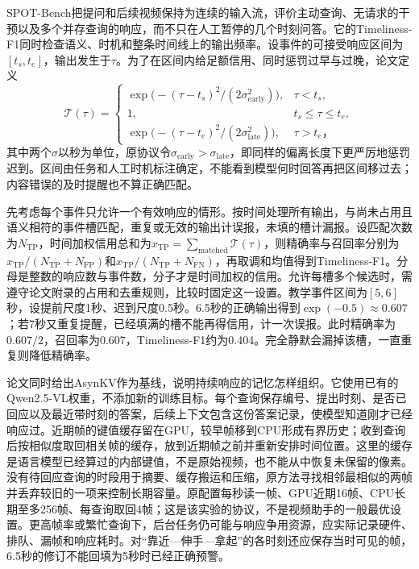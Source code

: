 SPOT-Bench把提问和后续视频保持为连续的输入流，评价主动查询、无请求的干预以及多个并存查询的响应，而不只在人工暂停的几个时刻问答。它的Timeliness-F1同时检查语义、时机和整条时间线上的输出频率。设事件的可接受响应区间为$[t_s,t_e]$，输出发生于$\tau$。为了在区间内给足额信用、同时惩罚过早与过晚，论文定义
\begin{equation}
 \mathcal{T}(\tau)=
 \begin{cases}
  \exp\!\bigl(-(\tau-t_s)^2/(2\sigma_{\mathrm{early}}^2)\bigr),
    &\tau<t_s,\\
  1,&t_s\leq\tau\leq t_e,\\
  \exp\!\bigl(-(\tau-t_e)^2/(2\sigma_{\mathrm{late}}^2)\bigr),
    &\tau>t_e\text{，}
 \end{cases}
 \label{eq:vision-video-timeliness}
\end{equation}
其中两个$\sigma$以秒为单位，原协议令$\sigma_{\mathrm{early}}>\sigma_{\mathrm{late}}$，即同样的偏离长度下更严厉地惩罚迟到。区间由任务和人工时机标注确定，不能看到模型何时回答再把区间移过去；内容错误的及时提醒也不算正确匹配。

先考虑每个事件只允许一个有效响应的情形。按时间处理所有输出，与尚未占用且语义相符的事件槽匹配，重复或无效的输出计误报，未填的槽计漏报。设匹配次数为$N_{\mathrm{TP}}$，时间加权信用总和为$x_{\mathrm{TP}}=\sum_{\mathrm{matched}}\mathcal{T}(\tau)$，则精确率与召回率分别为$x_{\mathrm{TP}}/(N_{\mathrm{TP}}+N_{\mathrm{FP}})$和$x_{\mathrm{TP}}/(N_{\mathrm{TP}}+N_{\mathrm{FN}})$，再取调和均值得到Timeliness-F1。分母是整数的响应数与事件数，分子才是时间加权的信用。允许每槽多个候选时，需遵守论文附录的占用和去重规则，比较时固定这一设置。教学事件区间为$[5,6]$秒，设提前尺度1秒、迟到尺度0.5秒。6.5秒的正确输出得到$\exp(-0.5)\approx0.607$；若7秒又重复提醒，已经填满的槽不能再得信用，计一次误报。此时精确率为$0.607/2$，召回率为0.607，Timeliness-F1约为0.404。完全静默会漏掉该槽，一直重复则降低精确率。

论文同时给出AsynKV作为基线，说明持续响应的记忆怎样组织。它使用已有的Qwen2.5-VL权重，不添加新的训练目标。每个查询保存编号、提出时刻、是否已回应以及最近带时刻的答案，后续上下文包含这份答案记录，使模型知道刚才已经响应过。近期帧的键值缓存留在GPU，较早帧移到CPU形成有界历史；收到查询后按相似度取回相关帧的缓存，放到近期帧之前并重新安排时间位置。这里的缓存是语言模型已经算过的内部键值，不是原始视频，也不能从中恢复未保留的像素。没有待回应查询的时段用于摘要、缓存搬运和压缩，原方法寻找相邻最相似的两帧并丢弃较旧的一项来控制长期容量。原配置每秒读一帧、GPU近期16帧、CPU长期至多256帧、每查询取回4帧；这是该实验的协议，不是视频助手的一般最优设置。更高帧率或繁忙查询下，后台任务仍可能与响应争用资源，应实际记录硬件、排队、漏帧和响应耗时。对“靠近—伸手—拿起”的各时刻还应保存当时可见的帧，6.5秒的修订不能回填为5秒时已经正确预警。


